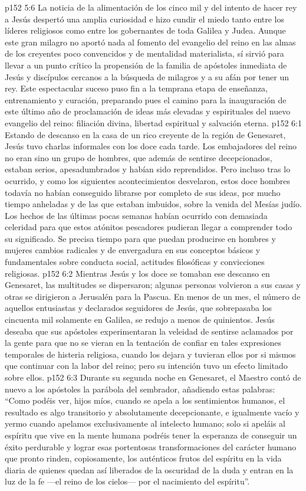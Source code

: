 \vs p152 5:6 La noticia de la alimentación de los cinco mil y del intento de hacer rey a Jesús despertó una amplia curiosidad e hizo cundir el miedo tanto entre los líderes religiosos como entre los gobernantes de toda Galilea y Judea. Aunque este gran milagro no aportó nada al fomento del evangelio del reino en las almas de los creyentes poco convencidos y de mentalidad materialista, sí sirvió para llevar a un punto crítico la propensión de la familia de apóstoles inmediata de Jesús y discípulos cercanos a la búsqueda de milagros y a su afán por tener un rey. Este espectacular suceso puso fin a la temprana etapa de enseñanza, entrenamiento y curación, preparando pues el camino para la inauguración de este último año de proclamación de ideas más elevadas y espirituales del nuevo evangelio del reino: filiación divina, libertad espiritual y salvación eterna.
\vs p152 6:1 Estando de descanso en la casa de un rico creyente de la región de Genesaret, Jesús tuvo charlas informales con los doce cada tarde. Los embajadores del reino no eran sino un grupo de hombres, que además de sentirse decepcionados, estaban serios, apesadumbrados y habían sido reprendidos. Pero incluso tras lo ocurrido, y como los siguientes acontecimientos desvelaron, estos doce hombres todavía no habían conseguido librarse por completo de sus ideas, por mucho tiempo anheladas y de las que estaban imbuidos, sobre la venida del Mesías judío. Los hechos de las últimas pocas semanas habían ocurrido con demasiada celeridad para que estos atónitos pescadores pudieran llegar a comprender todo su significado. Se precisa tiempo para que puedan producirse en hombres y mujeres cambios radicales y de envergadura en sus conceptos básicos y fundamentales sobre conducta social, actitudes filosóficas y convicciones religiosas.
\vs p152 6:2 Mientras Jesús y los doce se tomaban ese descanso en Genesaret, las multitudes se dispersaron; algunas personas volvieron a sus casas y otras se dirigieron a Jerusalén para la Pascua. En menos de un mes, el número de aquellos entusiastas y declarados seguidores de Jesús, que sobrepasaba los cincuenta mil solamente en Galilea, se redujo a menos de quinientos. Jesús deseaba que sus apóstoles experimentaran la veleidad de sentirse aclamados por la gente para que no se vieran en la tentación de confiar en tales expresiones temporales de histeria religiosa, cuando los dejara y tuvieran ellos por si mismos que continuar con la labor del reino; pero su intención tuvo un efecto limitado sobre ellos.
\vs p152 6:3 \pc Durante su segunda noche en Genesaret, el Maestro contó de nuevo a los apóstoles la parábola del sembrador, añadiendo estas palabras: “Como podéis ver, hijos míos, cuando se apela a los sentimientos humanos, el resultado es algo transitorio y absolutamente decepcionante, e igualmente vacío y yermo cuando apelamos exclusivamente al intelecto humano; solo si apeláis al espíritu que vive en la mente humana podréis tener la esperanza de conseguir un éxito perdurable y lograr esas portentosas transformaciones del carácter humano que pronto rinden, copiosamente, los auténticos frutos del espíritu en la vida diaria de quienes quedan así liberados de la oscuridad de la duda y entran en la luz de la fe ---el reino de los cielos--- por el nacimiento del espíritu”.
